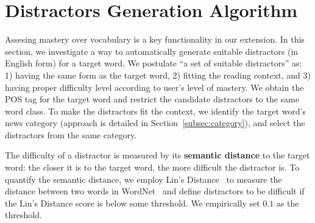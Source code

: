 \section{Distractors Generation Algorithm}
\label{sec:distractor}
Assesing mastery over vocabulary is a key functionality in our extension. In this section, we investigate a way to automatically generate suitable distractors (in English form) for a target word. We postulate ``a  set of suitable distractors'' as: 1) having the same form as the target word, 2) fitting the reading context, and 3) having proper difficulty level according to user's level of mastery.
We obtain the POS tag for the target word and restrict the candidate distractors to the same word class.
To make the distractors fit the context, we identify the target word's news category (approach is detailed in Section~\ref{subsec:category}), and select the distractors from the same category.



The difficulty of a distractor is measured by its {\bf semantic distance} to the target word: the closer it is to the target word, the more difficult the distractor is. To quantify the semantic distance, we employ  Lin's Distance~\cite{lin98} to measure the distance between two words in WordNet~\cite{Miller1995} and define distractors to be difficult if the Lin's Distance score is below some threshold. 
We empirically set $0.1$ as the threshold.



